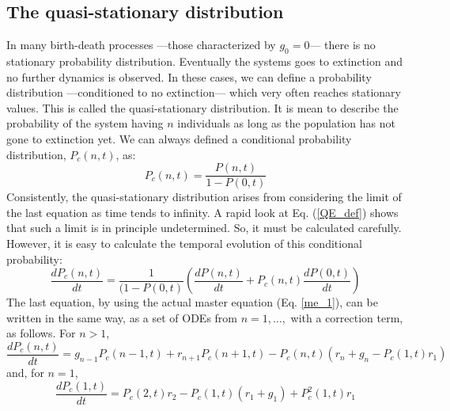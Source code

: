 \subsection{The quasi-stationary distribution}
\label{quasi-stationary}
In many birth-death processes ---those characterized by $g_0=0$--- there is no stationary probability distribution. Eventually the systems goes to extinction and no further dynamics is observed. In these cases, we can define a probability distribution ---conditioned to no extinction--- which very often reaches stationary values. This is called the quasi-stationary distribution. It is mean to describe the probability of the system having $n$ individuals as long as the population has not gone to extinction yet. We can always defined a conditional probability distribution, $P_c(n,t)$, as:
\begin{equation}
  \label{QE_def}
  P_c(n,t) = \frac{P(n,t)}{1-P(0,t)}
\end{equation}
Consistently, the quasi-stationary distribution arises from considering the limit of the last equation as time tends to infinity. A rapid look at Eq. (\ref{QE_def}) shows that such a limit is in principle undetermined. So, it must be calculated carefully. However, it is easy to calculate the temporal evolution of this conditional probability:
\begin{equation}
  \frac{dP_c(n,t)}{dt} =  \frac{1}{(1 - P(0,t)}\left(\frac{dP(n,t)}{dt} + P_c(n,t)\frac{dP(0,t)}{dt}\right)
\end{equation}
The last equation, by using the actual master equation (Eq. \ref{me_1}), can be written in the same way, as a set of ODEs from $n=1, \dots, $ with a correction term, as follows. For $n>1$,
\begin{equation}
  \label{QE_1}
  \frac{dP_c(n,t)}{dt} = g_{n-1} P_c(n-1,t) + r_{n+1} P_c(n+1,t) - P_c(n,t)\left(r_n + g_n - P_c(1,t)r_1\right)
\end{equation}
and, for $n=1$,
\begin{equation}
  \label{QE_2}
  \frac{dP_c(1,t)}{dt} = P_c(2,t) r_2 - P_c(1,t)\left(r_1 + g_1\right) + P_c^2(1,t) r_1
\end{equation}

